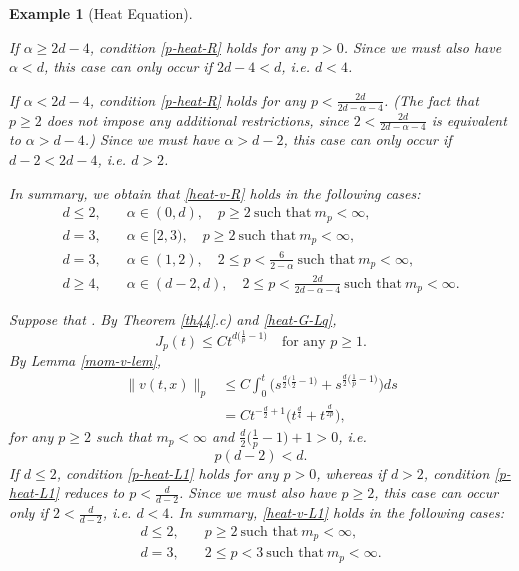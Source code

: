\documentclass[12pt]{article}
\newtheorem{example}[theorem]{Example}
\def\bR{\mathbb{R}}
\def\k{\kappa}
\begin{document}
\begin{example}[Heat Equation]
\begin{description}
If $\alpha \geq 2d-4$, condition \eqref{p-heat-R} holds for any $p>0$. Since we must also have $\alpha<d$, this case can only occur if $2d-4<d$, i.e. $d<4$.

If $\alpha<2d-4$, condition \eqref{p-heat-R} holds for any $p<\frac{2d}{2d-\alpha-4}$. (The fact that $p\geq 2$ does not impose any additional restrictions, since $2<\frac{2d}{2d-\alpha-4}$ is equivalent to $\alpha>d-4$.) Since we must have $\alpha> d-2$, this case can only occur if $d-2<2d-4$, i.e. $d>2$.

In summary, we obtain that \eqref{heat-v-R} holds in the following cases:
\begin{align*}
d\leq 2, & \quad \alpha \in (0,d), \quad p\geq 2 \ \mbox{such that} \ m_p<\infty,\\
d=3, & \quad \alpha \in [2,3), \quad p\geq 2 \ \mbox{such that} \ m_p<\infty, \\
d=3, & \quad \alpha \in (1,2), \quad 2\leq p<\frac{6}{2-\alpha} \ \mbox{such that} \ m_p<\infty, \\
d\geq 4, & \quad \alpha \in (d-2,d), \quad 2\leq p<\frac{2d}{2d-\alpha-4} \ \mbox{such that} \ m_p<\infty .
\end{align*}

\item[(iii)] Suppose that \fbox{$\k\in L^1(\bR^d)$}. By Theorem \ref{th44}.c) and \eqref{heat-G-Lq},
\begin{equation}
\label{heat-J-L}
J_p(t) \leq C t^{d\big(\frac{1}{p}-1 \big)} \quad \mbox{for any $p\geq 1$}.
\end{equation}
By Lemma \ref{mom-v-lem},
\begin{align}
\nonumber
\|v(t,x)\|_p & \leq C \int_0^t \Big(s^{\frac{d}{2}\big(\frac{1}{2}-1 \big)} + s^{\frac{d}{2}\big(\frac{1}{p}-1 \big)}  \Big) ds\\
\label{heat-v-L1}
&=C t^{-\frac{d}{2}+1} \big(t^{\frac{d}{4}}+t^{\frac{d}{2p}} \big),
\end{align}
for any $p\geq 2$ such that $m_p<\infty$ and $\frac{d}{2}\big(\frac{1}{p}-1 \big)+1>0$, i.e.
\begin{equation}
\label{p-heat-L1}
p(d-2)<d.
\end{equation}
If $d\leq 2$, condition \eqref{p-heat-L1} holds for any $p>0$, whereas if $d>2$, condition \eqref{p-heat-L1} reduces to $p<\frac{d}{d-2}$. Since we must also have $p\geq 2$, this case can occur only if $2<\frac{d}{d-2}$, i.e. $d<4$.
In summary, \eqref{heat-v-L1} holds in the following cases:
\begin{align*}
d\leq 2, & \quad p\geq 2 \ \mbox{such that} \ m_p<\infty,\\
d=3, & \quad 2 \leq p<3 \ \mbox{such that}  \ m_p<\infty.
\end{align*}

\end{description}

\end{example}
\end{document}
